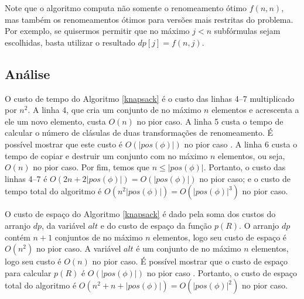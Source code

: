 Note que o algoritmo computa não somente o renomeamento ótimo $f(n,n)$, mas também os renomeamentos ótimos para versões mais restritas do problema. Por exemplo, se quisermos permitir que no máximo $j < n$ subfórmulas sejam escolhidas, basta utilizar o resultado $dp[j] = f(n,j)$.

\subsection{Análise}

\indent

O custo de tempo do Algoritmo \ref{knapsack} é o custo das linhas 4--7 multiplicado por $n^2$. A linha 4, que cria um conjunto de no máximo $n$ elementos e acrescenta a ele um novo elemento, custa $O(n)$ no pior caso. A linha 5 custa o tempo de calcular o número de clásulas de duas transformações de renomeamento. É possível mostrar que este custo é $O(|pos(\phi)|)$ no pior caso \cite{nonnengart2001computing}. A linha 6 custa o tempo de copiar e destruir um conjunto com no máximo $n$ elementos, ou seja, $O(n)$ no pior caso. Por fim, temos que $n \leq |pos(\phi)|$. Portanto, o custo das linhas 4--7 é $O(2n + 2|pos(\phi)|) = O(|pos(\phi)|)$ no pior caso; e o custo de tempo total do algoritmo é $O(n^2 |pos(\phi)|) = O(|pos(\phi)|^3)$ no pior caso.

O custo de espaço do Algoritmo \ref{knapsack} é dado pela soma dos custos do arranjo $dp$, da variável $alt$ e do custo de espaço da função $p(R)$. O arranjo $dp$ contém $n+1$ conjuntos de no máximo $n$ elementos, logo seu custo de espaço é $O(n^2)$ no pior caso. A variável $alt$ é um conjunto de no máximo $n$ elementos, logo seu custo é $O(n)$ no pior caso. É possível mostrar que o custo de espaço para calcular $p(R)$ é $O(|pos(\phi)|)$ no pior caso \cite{nonnengart2001computing}. Portanto, o custo de espaço total do algoritmo é $O(n^2 + n + |pos(\phi)|) = O(|pos(\phi)|^2)$ no pior caso.
